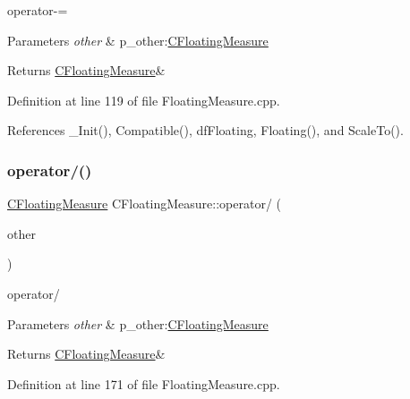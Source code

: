 operator-\/= 


\begin{DoxyParams}{Parameters}
{\em other} & p\+\_\+other\+:\hyperlink{classCFloatingMeasure}{C\+Floating\+Measure} \\
\hline
\end{DoxyParams}
\begin{DoxyReturn}{Returns}
\hyperlink{classCFloatingMeasure}{C\+Floating\+Measure}\& 
\end{DoxyReturn}


Definition at line 119 of file Floating\+Measure.\+cpp.



References \+\_\+\+Init(), Compatible(), df\+Floating, Floating(), and Scale\+To().

\mbox{\label{classCFloatingMeasure_acb68f4d17606dc2312f4efabe877ab80}} 
\subsubsection{\texorpdfstring{operator/()}{operator/()}\hspace{0.1cm}{\footnotesize\ttfamily [1/2]}}
{\footnotesize\ttfamily \hyperlink{classCFloatingMeasure}{C\+Floating\+Measure} C\+Floating\+Measure\+::operator/ (\begin{DoxyParamCaption}\item[{const \hyperlink{classCFloatingMeasure}{C\+Floating\+Measure} \&}]{other }\end{DoxyParamCaption})}



operator/ 


\begin{DoxyParams}{Parameters}
{\em other} & p\+\_\+other\+:\hyperlink{classCFloatingMeasure}{C\+Floating\+Measure} \\
\hline
\end{DoxyParams}
\begin{DoxyReturn}{Returns}
\hyperlink{classCFloatingMeasure}{C\+Floating\+Measure}\& 
\end{DoxyReturn}


Definition at line 171 of file Floating\+Measure.\+cpp.

\mbox{\label{classCFloatingMeasure_ac39b5a05cce42097d4439627aaaaf94c}} 
